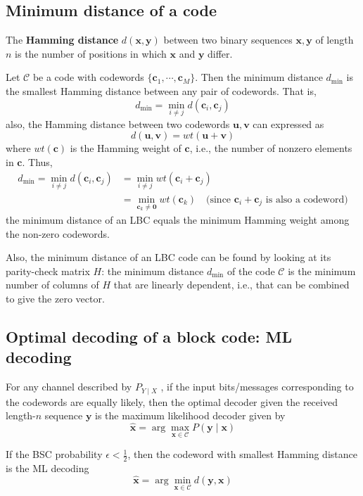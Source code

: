 \documentclass[11pt]{article}
\begin{document}
\subsection{Minimum distance of a code}
The \textbf{Hamming distance} $d(\boldsymbol{x}, \boldsymbol{y})$ between two binary sequences $\boldsymbol{x}, \boldsymbol{y}$ of length $n$ is the number of positions in which $\boldsymbol{x}$ and $\boldsymbol{y}$ differ.

Let $\mathcal{C}$ be a code with codewords $\{ \boldsymbol{c}_1, \cdots, \boldsymbol{c}_{M} \}$. Then the
minimum distance $d_{\min}$ is the smallest Hamming distance
between any pair of codewords. That is,
\[
d_{\min} = \min_{i \neq j} d(\boldsymbol{c}_i, \boldsymbol{c}_j)
\]
also, the Hamming distance between two codewords $\boldsymbol{u}, \boldsymbol{v}$ can expressed as
\[
d(\boldsymbol{u}, \boldsymbol{v}) = wt(\boldsymbol{u} + \boldsymbol{v})
\]
where $wt(\boldsymbol{c})$ is the Hamming weight of $\boldsymbol{c}$, i.e., the number of nonzero elements in $\boldsymbol{c}$. Thus,
\[
\begin{aligned}
d_{\min} = \min_{i \neq j} d(\boldsymbol{c}_i, \boldsymbol{c}_j) &= \min_{i \neq j} wt(\boldsymbol{c}_i + \boldsymbol{c}_j) \\
&= \min_{\boldsymbol{c}_k \neq \boldsymbol{0}} wt(\boldsymbol{c}_k) \quad \text{(since $\boldsymbol{c}_i + \boldsymbol{c}_j$ is also a codeword)}
\end{aligned}
\]
the minimum distance of an LBC equals the minimum Hamming weight among the non-zero codewords.

Also, the minimum distance of an LBC code can be found by looking at its parity-check matrix $H$: the minimum distance $d_{\min}$ of the code $\mathcal{C}$ is
the minimum number of columns of $H$ that are linearly dependent, i.e., that can be combined to give the zero vector.

\subsection{Optimal decoding of a block code: ML decoding}
For any channel described by $P_{Y \mid X}$ , if the input bits/messages
corresponding to the codewords are equally likely, then the optimal
decoder given the received length-$n$ sequence $\boldsymbol{y}$ is the
maximum likelihood decoder given by
\[
\hat{\boldsymbol{x}} = \arg\max_{\boldsymbol{x} \in \mathcal{C}} P(\boldsymbol{y} \mid \boldsymbol{x})
\]

If the BSC probability $\epsilon < \frac{1}{2}$, then the codeword with smallest Hamming distance is the ML decoding
\[
\hat{\boldsymbol{x}} = \arg\min_{\boldsymbol{x} \in \mathcal{C}} d(\boldsymbol{y}, \boldsymbol{x})
\]
\end{document}
